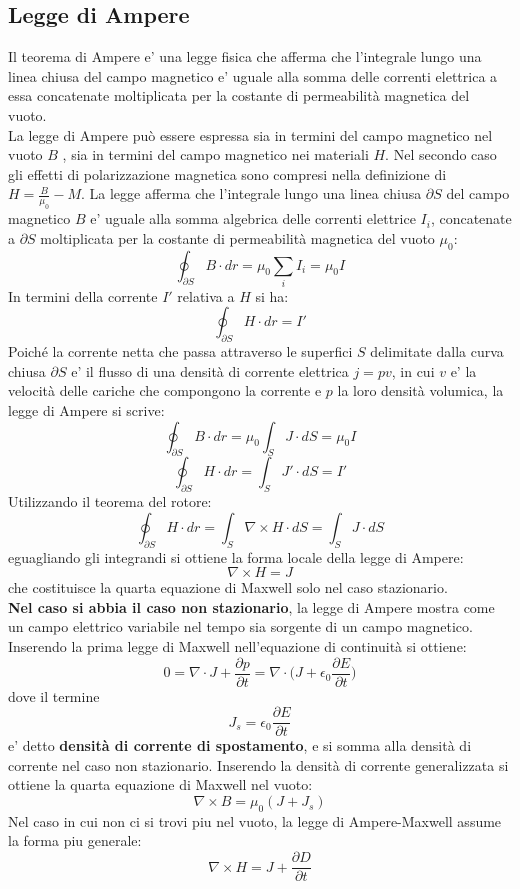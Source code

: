 \documentclass[a4paper, 10pt]{article}
\begin{document}
		\subsection{Legge di Ampere}
			Il teorema di Ampere e' una legge fisica che afferma che l'integrale lungo una linea chiusa
			del campo magnetico e' uguale alla somma delle correnti elettrica a essa concatenate moltiplicata per la costante di
			permeabilità magnetica del vuoto. \\
			La legge di Ampere può essere espressa sia in termini del campo magnetico nel vuoto $B$ , sia in termini del campo 
			magnetico nei materiali $H$. Nel secondo caso gli effetti di polarizzazione magnetica sono compresi nella 
			definizione di $ H = \frac{B}{\mu_0} - M $. La legge afferma che l'integrale lungo una linea chiusa $\partial S$ del 
			campo magnetico $B$ e' uguale alla somma algebrica delle correnti elettrice $I_i$, concatenate a $\partial S$ 
			moltiplicata per la costante di permeabilità magnetica del vuoto $\mu_0$:
			\[ \oint_{\partial S} B \cdot dr = \mu_0 \sum_i I_i = \mu_0 I \] In termini della corrente $I'$ relativa a $H$ si ha:
			\[ \oint_{\partial S} H \cdot dr = I' \]
			Poiché la corrente netta che passa attraverso le superfici $S$ delimitate dalla curva chiusa $\partial S$ e' il
			flusso di una densità di corrente elettrica $j = pv$, in cui $v$ e' la velocità delle cariche che compongono
			la corrente e $p$ la loro densità volumica, la legge di Ampere si scrive:
			\[ \oint_{\partial S} B \cdot dr = \mu_0 \int_S J \cdot dS = \mu_0 I \]
			\[ \oint_{\partial S} H \cdot dr = \int_S J' \cdot dS = I' \]
			Utilizzando il teorema del rotore:
			\[ \oint_{\partial S} H \cdot dr = \int_S \nabla \times H \cdot dS = \int_S J \cdot dS \] eguagliando gli integrandi
			si ottiene la forma locale della legge di Ampere:
			\[ \nabla \times H = J \] che costituisce la quarta equazione di Maxwell solo nel caso stazionario.\\
			\textbf{Nel caso si abbia il caso non stazionario}, la legge di Ampere mostra come un campo elettrico
			variabile nel tempo sia sorgente di un campo magnetico. Inserendo la prima legge di Maxwell
			nell'equazione di continuità si ottiene: \[ 0 = \nabla \cdot J + \frac{\partial p}{\partial t} = 
			\nabla \cdot \bigl ( J + \epsilon_0 \frac{\partial E}{\partial t}  \bigr ) \] dove il termine 
			\[ J_s = \epsilon_0 \frac{\partial E}{\partial t} \] e' detto \textbf{densità di corrente di spostamento}, 
			e si somma alla densità di corrente nel caso non stazionario. Inserendo la densità di corrente 
			generalizzata si ottiene la quarta equazione di Maxwell nel vuoto:
			\[ \nabla \times B = \mu_0 ( J + J_s) \]
			Nel caso in cui non ci si trovi piu nel vuoto, la legge di Ampere-Maxwell assume la forma piu generale:
			\[ \nabla \times H = J + \frac{\partial D }{\partial t} \]
\end{document}

